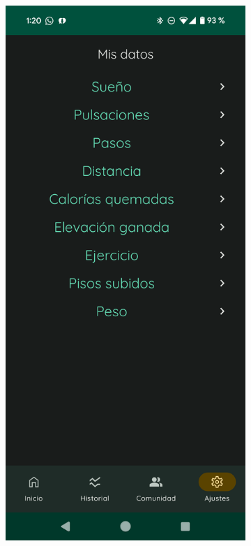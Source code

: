                 \begin{figure}[htbp]
                	\centering
                	\begin{subfigure}[c]{0.4\textwidth}
                		\centering
                		\includegraphics[width=1\textwidth]{figures/pantallas/Mis datos.png}

\end{subfigure}
\end{figure}
